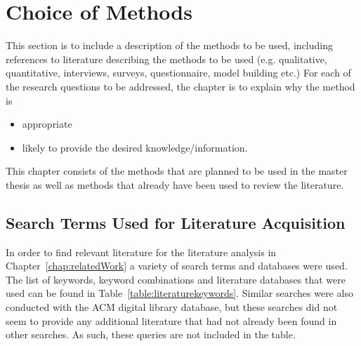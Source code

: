 \chapter{Choice of Methods}\label{chap:methods}

This section is to include a description of the methods to be used,
including references to literature describing the methods to be used
(e.g. qualitative, quantitative, interviews, surveys,
questionnaire,  model building etc.)
For each of the research questions to be addressed,
the chapter is to explain why the method is
\begin{itemize}
\item appropriate
\item likely to provide the desired knowledge/information.
\end{itemize}
\fi
This chapter consists of the methods that are planned to be used in the master thesis as well as methods that already have been used to review the literature. 

\section{Search Terms Used for Literature Acquisition}
In order to find relevant literature for the literature analysis in Chapter~\ref{chap:relatedWork} a variety of search terms and databases were used. The list of keywords, keyword combinations and literature databases that were used can be found in Table~\ref{table:literaturekeywords}. 
Similar searches were also conducted with the ACM digital library database, but these searches did not seem to provide any additional literature that had not already been found in other searches. As such, these queries are not included in the table.

